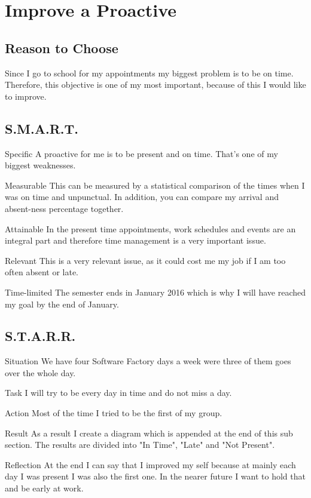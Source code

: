 \section{Improve a Proactive}
	\subsection{Reason to Choose}
		Since I go to school for my appointments my biggest problem is to be on time. Therefore, this objective is one of my most important, because of this I would like to improve.
	
	\subsection{S.M.A.R.T.}
		\begin{SMART}
		    \item[Specific] A proactive for me is to be present and on time. That's one of my biggest weaknesses.
		    \item[Measurable] This can be measured by a statistical comparison of the times when I was on time and unpunctual. In addition, you can compare my arrival and absent-ness percentage together.
		    \item[Attainable] In the present time appointments, work schedules and events are an integral part and therefore time management is a very important issue.
		    \item[Relevant] This is a very relevant issue, as it could cost me my job if I am too often absent or late.
		    \item[Time-limited] The semester ends in January 2016 which is why I will have reached my goal by the end of January.
		\end{SMART}
	
	\subsection{S.T.A.R.R.}
		\begin{STARR}
		    \item[Situation] We have four Software Factory days a week were three of them goes over the whole day.
		    \item[Task] I will try to be every day in time and do not miss a day.
		    \item[Action] Most of the time I tried to be the first of my group.
		    \item[Result] As a result I create a diagram which is appended at the end of this sub section. The results are divided into "In Time", "Late" and "Not Present".
		    \item[Reflection] At the end I can say that I improved my self because at mainly each day I was present I was also the first one. In the nearer future I want to hold that and be early at work.
		\end{STARR}
		
